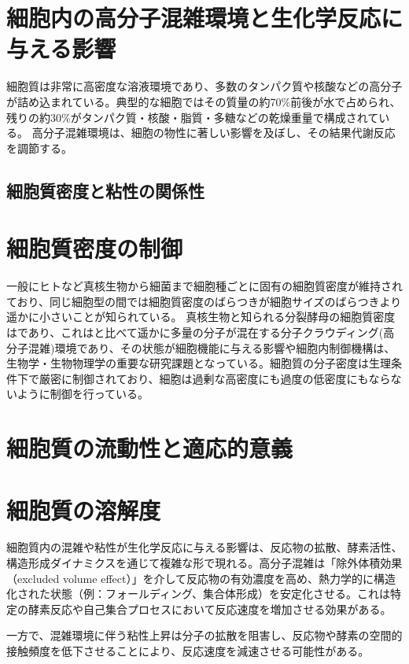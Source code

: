 \section{細胞内の高分子混雑環境と生化学反応に与える影響}
細胞質は非常に高密度な溶液環境であり、多数のタンパク質や核酸などの高分子が詰め込まれている。典型的な細胞ではその質量の約70\%前後が水で占められ、残りの約30\%がタンパク質・核酸・脂質・多糖などの乾燥重量で構成されている。\cite{monterroso2024macromolecular}
高分子混雑環境は、細胞の物性に著しい影響を及ぼし、その結果代謝反応を調節する。
\subsection{細胞質密度と粘性の関係性}
\section{細胞質密度の制御}
一般にヒトなど真核生物から細菌まで細胞種ごとに固有の細胞質密度が維持されており、同じ細胞型の間では細胞質密度のばらつきが細胞サイズのばらつきより遥かに小さいことが知られている。\cite{neurohr2020relevance}
真核生物と知られる分裂酵母の細胞質密度はであり、これはと比べて遥かに多量の分子が混在する分子クラウディング(高分子混雑)環境であり、その状態が細胞機能に与える影響や細胞内制御機構は、生物学・生物物理学の重要な研究課題となっている。細胞質の分子密度は生理条件下で厳密に制御されており、細胞は過剰な高密度にも過度の低密度にもならないように制御を行っている。
\section{細胞質の流動性と適応的意義}
\cite{persson2020viscoadaptation}
\section{細胞質の溶解度}
細胞質内の混雑や粘性が生化学反応に与える影響は、反応物の拡散、酵素活性、構造形成ダイナミクスを通じて複雑な形で現れる。高分子混雑は「除外体積効果（excluded volume effect）」を介して反応物の有効濃度を高め、熱力学的に構造化された状態（例：フォールディング、集合体形成）を安定化させる。これは特定の酵素反応や自己集合プロセスにおいて反応速度を増加させる効果がある。

一方で、混雑環境に伴う粘性上昇は分子の拡散を阻害し、反応物や酵素の空間的接触頻度を低下させることにより、反応速度を減速させる可能性がある。
